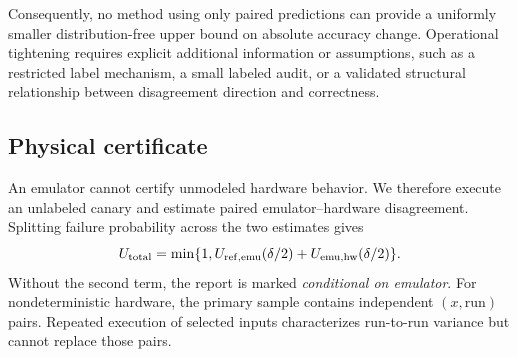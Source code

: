 Consequently, no method using only paired predictions can provide a uniformly
smaller distribution-free upper bound on absolute accuracy change. Operational
tightening requires explicit additional information or assumptions, such as a
restricted label mechanism, a small labeled audit, or a validated structural
relationship between disagreement direction and correctness.

\subsection{Physical certificate}

An emulator cannot certify unmodeled hardware behavior. We therefore execute an
unlabeled canary and estimate paired emulator--hardware disagreement. Splitting
failure probability across the two estimates gives
\begin{equation}
U_{\mathrm{total}}=\min\{1,
U_{\mathrm{ref},\mathrm{emu}}(\delta/2)+U_{\mathrm{emu},\mathrm{hw}}(\delta/2)\}.
\end{equation}
Without the second term, the report is marked \emph{conditional on emulator}.
For nondeterministic hardware, the primary sample contains independent
$(x,\text{run})$ pairs. Repeated execution of selected inputs characterizes
run-to-run variance but cannot replace those pairs.
